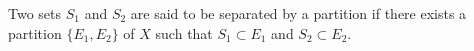 Two sets $S_1$ and $S_2$ are said to be separated by a partition if there exists a partition $\{E_1, E_2\}$ of $X$ such that $S_1 \subset E_1$ and $S_2 \subset E_2$.
